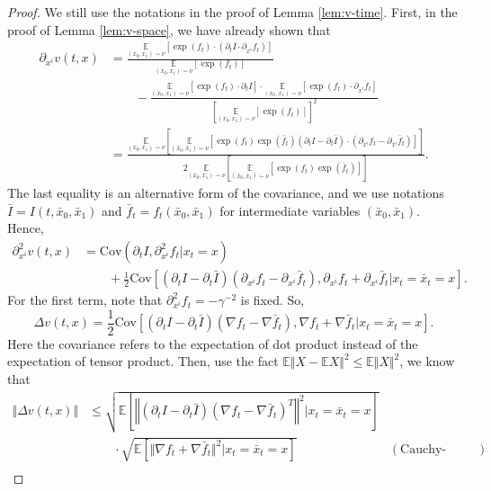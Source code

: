 \begin{proof}
    We still use the notations in the proof of Lemma \ref{lem:v-time}. First, in the proof of Lemma \ref{lem:v-space}, we have already shown that
    $$\begin{aligned}
        \partial_{x^i}v(t,x)&=
        \frac{\underset{(x_0,x_1)\sim\nu}{\mathbb{E}}[\exp(f_t)\cdot(\partial_tI\cdot\partial_{x^i}f_t)]}{\underset{(x_0,x_1)\sim\nu}{\mathbb{E}}[\exp(f_t)]}\\
        &\qquad-\frac{\underset{(x_0,x_1)\sim\nu}{\mathbb{E}}[\exp(f_t)\cdot\partial_tI]\cdot\underset{(x_0,x_1)\sim\nu}{\mathbb{E}}[\exp(f_t)\cdot\partial_{x^i}f_t]}{\left[\underset{(x_0,x_1)\sim\nu}{\mathbb{E}}[\exp(f_t)]\right]^2}\\
        &=\frac{\underset{(x_0,x_1)\sim\nu}{\mathbb{E}}\left[\underset{(\bar{x}_0,\bar{x}_1)\sim\nu}{\mathbb{E}}[\exp(f_t)\exp(\bar{f}_t)(\partial_tI-\partial_t\bar{I})\cdot(\partial_{x^i}f_t-\partial_{x^i}\bar{f}_t)]\right]}{2\underset{(x_0,x_1)\sim\nu}{\mathbb{E}}\left[\underset{(\bar{x}_0,\bar{x}_1)\sim\nu}{\mathbb{E}}[\exp(f_t)\exp(\bar{f}_t)]\right]}.
    \end{aligned}$$
    The last equality is an alternative form of the covariance, and we use notations $\bar{I}=I(t,\bar{x}_0,\bar{x}_1)$ and $\bar{f}_t=f_t(\bar{x}_0,\bar{x}_1)$ for intermediate variables $(\bar{x}_0,\bar{x}_1)$.
    Hence, $$\begin{aligned}
        \partial^2_{x^i}v(t,x)&=\text{Cov}(\partial_tI,\partial_{x^i}^2f_t|x_t=x)\\
        &\qquad+\frac{1}{2}\text{Cov}[(\partial_tI-\partial_t\bar{I})(\partial_{x^i}f_t-\partial_{x^i}\bar{f}_t),\partial_{x^i}f_t+\partial_{x^i}\bar{f}_t|x_t=\bar{x}_t=x].
    \end{aligned}$$
    For the first term, note that $\partial^2_{x^i}f_t=-\gamma^{-2}$ is fixed. So,
    $$\Delta v(t,x)=\frac{1}{2}\text{Cov}[(\partial_tI-\partial_t\bar{I})(\nabla f_t-\nabla \bar{f}_t),\nabla f_t+\nabla\bar{f}_t|x_t=\bar{x}_t=x].$$
    Here the covariance refers to the expectation of dot product instead of the expectation of tensor product. Then, use the fact $\mathbb{E}\Vert X-\mathbb{E}X\Vert^2\le\mathbb{E}\Vert X\Vert^2$, we know that
    $$\begin{aligned}
        \Vert\Delta v(t,x)\Vert
        &\le\sqrt{\mathbb{E}[\left\Vert(\partial_tI-\partial_t\bar{I})(\nabla f_t-\nabla\bar{f}_t)^T\right\Vert^2|x_t=\bar{x}_t=x]}\\
        &\qquad\cdot\sqrt{\mathbb{E}[\Vert\nabla f_t+\nabla\bar{f}_t\Vert^2|x_t=\bar{x}_t=x]}&(\text{Cauchy-Schwarz inequality})\\

\end{aligned}$$
\end{proof}
